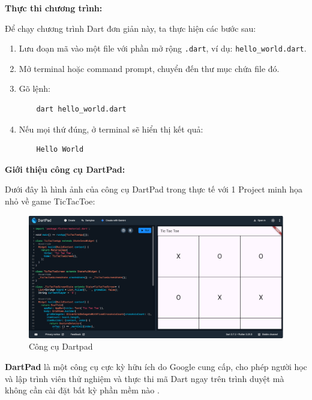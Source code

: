\documentclass[../DoAn.tex]{subfiles}
\numberwithin{figure}{chapter}
\begin{document}
\textbf{Thực thi chương trình:} 

Để chạy chương trình Dart đơn giản này, ta thực hiện các bước sau:
\begin{enumerate}
    \item Lưu đoạn mã vào một file với phần mở rộng \texttt{.dart}, ví dụ: \texttt{hello\_world.dart}.
    \item Mở terminal hoặc command prompt, chuyển đến thư mục chứa file đó.
    \item Gõ lệnh:
    \begin{verbatim}
    dart hello_world.dart
    \end{verbatim}
    \item Nếu mọi thứ đúng, ở terminal sẽ hiển thị kết quả:
    \begin{verbatim}
    Hello World
    \end{verbatim}
\end{enumerate}

\textbf{Giới thiệu công cụ DartPad:} 

Dưới đây là hình ảnh của công cụ DartPad trong thực tế với 1 Project minh họa nhỏ về game TicTacToe:

\begin{figure}[H]
    \centering
    \includegraphics[width=1\textwidth]{Hinhve/dartpad.png}
    \caption{Công cụ Dartpad}
    \label{fig:dartimg}
\end{figure}


\textbf{DartPad} là một công cụ cực kỳ hữu ích do Google cung cấp, cho phép người học và lập trình viên thử nghiệm và thực thi mã Dart ngay trên trình duyệt mà không cần cài đặt bất kỳ phần mềm nào .
\end{document}
